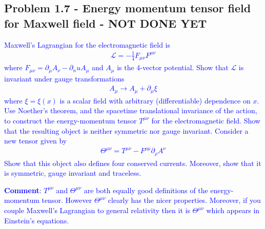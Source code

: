 \documentclass[../main.tex]{subfiles}
\begin{document}
\subsection{Problem 1.7 - Energy momentum tensor  field for Maxwell field - NOT DONE YET}

\textcolor{blue}{
Maxwell’s Lagrangian for the electromagnetic field is
\begin{align}
\mathcal{L}=-\frac{1}{4}F_{\mu\nu}F^{\mu\nu}
\end{align}
where $F_{\mu\nu}=\partial_\mu A_\nu-\partial_nu A_\mu$ and $A_\mu$ is the 4-vector potential. Show that $\mathcal{L}$ is invariant under gauge transformations
\begin{align}
A_\mu\rightarrow A_\mu+\partial_\mu\xi
\end{align}
where $\xi=\xi(x)$ is a scalar field with arbitrary (diﬀerentiable) dependence on $x$.
}
\textcolor{blue}{
Use Noether’s theorem, and the spacetime translational invariance of the action, to construct the energy-momentum tensor $T^{\mu\nu}$ for the electromagnetic field. Show that the resulting object is neither symmetric nor gauge invariant. Consider a new tensor given by
\begin{align}
\Theta^{\mu\nu} = T^{\mu\nu} - F^{\rho\mu}\partial_\rho A^\nu
\end{align}
Show that this object also defines four conserved currents. Moreover, show that it is symmetric, gauge invariant and traceless.
}\newline


\textcolor{blue}{
{\bf Comment}: $T^{\mu\nu}$ and $\Theta^{\mu\nu}$ are both equally good definitions of the energy-momentum tensor. However $\Theta^{\mu\nu}$ clearly has the nicer properties. Moreover, if you couple Maxwell’s Lagrangian to general relativity then it is $\Theta^{\mu\nu}$ which appears in Einstein’s equations.
}
\end{document}
